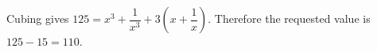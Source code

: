 Cubing gives $125=x^3+\dfrac{1}{x^3}+3(x+\dfrac{1}{x})$. Therefore the requested value is $125-15=\boxed{110}$.
